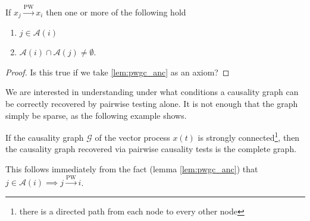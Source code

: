 \documentclass[12pt]{article}
\def\pwgc{\overset{\text{PW}}{\rightarrow}}  %
\def\gcg{\mathcal{G}}  %
\newcommand{\pa}[1]{pa(#1)}  %
\newcommand{\anc}[1]{\mathcal{A}(#1)}  %
\begin{document}




\begin{lemma}
  \label{lem:pwgc_anc}
  If $x_j \pwgc x_i$ then one or more of the following hold

  \begin{enumerate}
    \item{$j \in \anc{i}$}
    \item{$\anc{i}\cap\anc{j} \ne \emptyset$.}
  \end{enumerate}
\end{lemma}


\begin{proof}
  Is this true if we take \ref{lem:pwgc_anc} as an axiom?
\end{proof}


We are interested in understanding under what conditions a causality
graph can be correctly recovered by pairwise testing alone.  It is not
enough that the graph simply be sparse, as the following example shows.

\begin{example}
  If the causality graph $\gcg$ of the vector process $x(t)$ is
  strongly connected\footnote{there is a directed path from each node
    to every other node}, then the causality graph recovered via
  pairwise causality tests is the complete graph.

  This follows immediately from the fact (lemma \ref{lem:pwgc_anc})
  that $j \in \anc{i} \implies j \pwgc i$.
\end{example}
\end{document}

